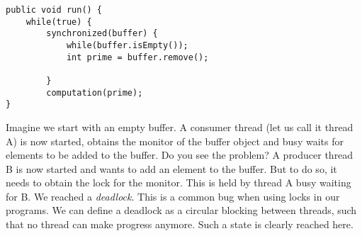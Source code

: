 \documentclass[main.tex]{subfiles}
\begin{document}
\begin{verbatim}
public void run() {
    while(true) {
        synchronized(buffer) {
            while(buffer.isEmpty());
            int prime = buffer.remove();

        }
        computation(prime);
}
\end{verbatim}
Imagine we start with an empty buffer. A consumer thread (let us call it thread A) is now started, obtains the monitor of the buffer object and busy waits for elements to be added to the buffer. Do you see the problem? A producer thread B is now started and wants to add an element to the buffer. But to do so, it needs to obtain the lock for the monitor. This is held by thread A busy waiting for B. We reached a \textit{deadlock}. This is a common bug when using locks in our programs. We can define a deadlock as a circular blocking between threads, such that no thread can make progress anymore. Such a state is clearly reached here.
\end{document}
